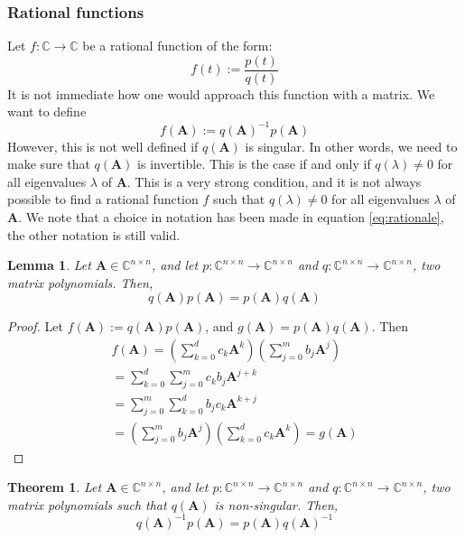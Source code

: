 \documentclass[11pt]{article}
\newtheorem{lemma}{Lemma}[section]
\newtheorem{theorem}{Theorem}[section]
\numberwithin{equation}{section}
\begin{document}
\subsubsection*{Rational functions}
Let $f:\mathbb{C}\rightarrow\mathbb{C}$ be a rational function of the form:
\begin{equation}
    f(t) := \frac{p(t)}{q(t)}
\end{equation}
It is not immediate how one would approach this function with a matrix. We want to define
\begin{equation}\label{eq:rationale}
    f(\mathbf{A}) := q(\mathbf{A})^{-1}p(\mathbf{A})
\end{equation}
However, this is not well defined if $q(\mathbf{A})$ is singular. In other words, we need to make sure that $q(\mathbf{A})$ is invertible. This is the case if and only if $q(\lambda) \neq 0$ for all eigenvalues $\lambda$ of $\mathbf{A}$. This is a very strong condition, and it is not always possible to find a rational function $f$ such that $q(\lambda) \neq 0$ for all eigenvalues $\lambda$ of $\mathbf{A}$. We note that a choice in notation has been made in equation \ref{eq:rationale}, the other notation is still valid.
\begin{lemma}\label{lem:commute}
     Let $\mathbf{A}\in\mathbb{C}^{n\times n}$, and let $p:\mathbb{C}^{n\times n}\rightarrow\mathbb{C}^{n\times n}$ and $q:\mathbb{C}^{n\times n}\rightarrow\mathbb{C}^{n\times n}$, two matrix polynomials. Then,
     \begin{equation}
         q(\mathbf{A})p(\mathbf{A}) = p(\mathbf{A})q(\mathbf{A})
     \end{equation}
\end{lemma}
\begin{proof}
    Let $f(\mathbf{A}) := q(\mathbf{A})p(\mathbf{A})$, and $g(\mathbf{A}) = p(\mathbf{A})q(\mathbf{A})$. Then
    \begin{align*}
        f(\mathbf{A}) = \left(\sum_{k=0}^d c_k\mathbf{A}^k\right)\left(\sum_{j=0}^m b_j\mathbf{A}^j\right)\\
        = \sum_{k=0}^d \sum_{j=0}^m c_kb_j\mathbf{A}^{j+k}\\
        = \sum_{j=0}^m \sum_{k=0}^d b_jc_k\mathbf{A}^{k+j}\\
        = \left(\sum_{j=0}^m b_j\mathbf{A}^j\right)\left(\sum_{k=0}^d c_k\mathbf{A}^k\right) = g(\mathbf{A})
    \end{align*}
\end{proof}
\begin{theorem}
    Let $\mathbf{A}\in\mathbb{C}^{n\times n}$, and let $p:\mathbb{C}^{n\times n}\rightarrow\mathbb{C}^{n\times n}$ and $q:\mathbb{C}^{n\times n}\rightarrow\mathbb{C}^{n\times n}$, two matrix polynomials such that $q(\mathbf{A})$ is non-singular. Then, 
    \begin{equation}
        q(\mathbf{A})^{-1}p(\mathbf{A}) = p(\mathbf{A})q(\mathbf{A})^{-1}
    \end{equation}
\end{theorem}
\end{document}
